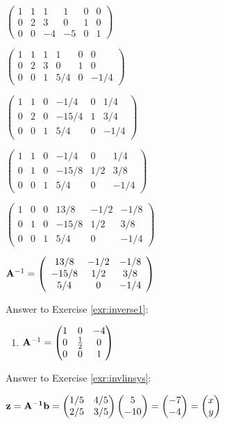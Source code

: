 \documentclass[
]{book}
\providecommand{\tightlist}{%
  \setlength{\itemsep}{0pt}\setlength{\parskip}{0pt}}
\theoremstyle{definition}
\theoremstyle{definition}
\theoremstyle{definition}
\theoremstyle{definition}
\theoremstyle{remark}
\begin{document}
\(\left(\begin{array}{ccc|ccc}  1&1&1 &1 &0&0\\  0&2&3 &0 &1&0\\  0&0&-4&-5&0&1 \end{array} \right)\)

\(\left(\begin{array}{ccc|ccc}  1&1&1&1 &0&0\\  0&2&3&0 &1&0\\  0&0&1&5/4&0&-1/4 \end{array} \right)\)

\(\left(\begin{array}{ccc|ccc}  1&1&0&-1/4 &0&1/4\\  0&2&0&-15/4&1&3/4\\  0&0&1&5/4 &0&-1/4 \end{array} \right)\)

\(\left(\begin{array}{ccc|ccc}  1&1&0&-1/4 &0 &1/4\\  0&1&0&-15/8&1/2&3/8\\  0&0&1&5/4 &0 &-1/4 \end{array} \right)\)

\(\left(\begin{array}{ccc|ccc}  1&0&0&13/8 &-1/2&-1/8\\  0&1&0&-15/8&1/2 &3/8\\  0&0&1&5/4 &0 &-1/4 \end{array} \right)\)

\({\bf A}^{-1} = \left(\begin{array}{ccc}  13/8 &-1/2&-1/8\\  -15/8&1/2 &3/8\\  5/4 &0 &-1/4 \end{array} \right)\)

Answer to Exercise \ref{exr:inverse1}:

\begin{enumerate}
\def\labelenumi{\arabic{enumi}.}
\tightlist
\item
  \({\bf A}^{-1}=\begin{pmatrix} 1&0&-4\\0&\frac{1}{2}&0\\0&0&1 \end{pmatrix}\)
\end{enumerate}

Answer to Exercise \ref{exr:invlinsys}:

\(\textbf{z} = \bf{A}^{-1} \bf{b} = \begin{pmatrix}  1/5 &4/5\\  2/5&3/5 \end{pmatrix} \begin{pmatrix}  5 \\  -10 \end{pmatrix}= \begin{pmatrix}  -7 \\  -4 \end{pmatrix} = \begin{pmatrix}  x \\  y \end{pmatrix}\)
\end{document}
